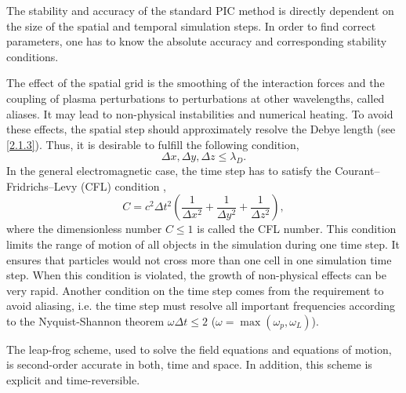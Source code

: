 The stability and accuracy of the standard PIC method is directly dependent on the size of the spatial and temporal simulation steps. In order to find correct parameters, one has to know the absolute accuracy and corresponding stability conditions.

The effect of the spatial grid is the smoothing of the interaction forces and the coupling of plasma perturbations to perturbations at other wavelengths, called aliases. It may lead to non-physical instabilities and numerical heating. To avoid these effects, the spatial step should approximately resolve the Debye length (see \ref{2.1.3}). Thus, it is desirable to fulfill the following condition,
\begin{equation}
\Delta x, \Delta y, \Delta z \leq \lambda_{D}.
\end{equation}
In the general electromagnetic case, the time step has to satisfy the Courant--Fridrichs--Levy (CFL) condition \cite{CFL1967},
\begin{equation}
\label{3.1.4.1}
C = c^{2} \Delta t^{2} \left(\frac{1}{\Delta x^{2}} + \frac{1}{\Delta y^{2}} + \frac{1}{\Delta z^{2}}\right),
\end{equation}
where the dimensionless number $ C \leq 1 $ is called the CFL number. This condition limits the range of motion of all objects in the simulation during one time step. It ensures that particles would not cross more than one cell in one simulation time step. When this condition is violated, the growth of non-physical effects can be very rapid. Another condition on the time step comes from the requirement to avoid aliasing, i.e. the time step must resolve all important frequencies according to the Nyquist-Shannon theorem \cite{Shannon1949} $ \omega \Delta t \leq 2 $ ($ \omega = \max\left( \omega_p, \omega_L \right) $).

The leap-frog scheme, used to solve the field equations and equations of motion, is second-order accurate in both, time and space. In addition, this scheme is explicit and time-reversible.